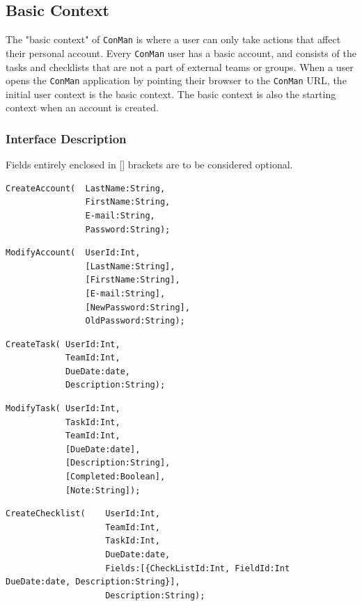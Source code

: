 \documentclass{article}
\begin{document}
\subsection{Basic Context}
The "basic context" of \texttt{ConMan} is where a user can only take actions that affect their personal account.
Every \texttt{ConMan} user has a basic account, and consists of the tasks and checklists that are not a part of external teams or groups.
When a user opens the \texttt{ConMan} application by pointing their browser to the \texttt{ConMan} URL, the initial user context is the basic context.
The basic context is also the starting context when an account is created.


\subsubsection{Interface Description}
Fields entirely enclosed in [] brackets are to be considered optional.
\begin{lstlisting}
CreateAccount(  LastName:String,
                FirstName:String,
                E-mail:String,
                Password:String);
\end{lstlisting}

\begin{lstlisting}
ModifyAccount(  UserId:Int,
                [LastName:String],
                [FirstName:String],
                [E-mail:String],
                [NewPassword:String],
                OldPassword:String);
\end{lstlisting}

\begin{lstlisting}
CreateTask( UserId:Int,
            TeamId:Int,
            DueDate:date,
            Description:String);
\end{lstlisting}

\begin{lstlisting}
ModifyTask( UserId:Int,
            TaskId:Int,
            TeamId:Int,
            [DueDate:date],
            [Description:String],
            [Completed:Boolean],
            [Note:String]);
\end{lstlisting}

\begin{lstlisting}
CreateChecklist(    UserId:Int,
                    TeamId:Int,
                    TaskId:Int,
                    DueDate:date,
                    Fields:[{CheckListId:Int, FieldId:Int DueDate:date, Description:String}],
                    Description:String);
\end{lstlisting}
\end{document}
